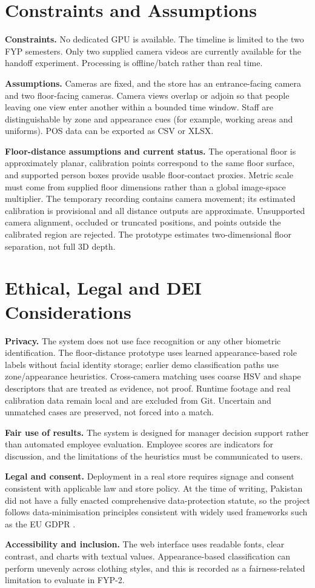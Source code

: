 \section{Constraints and Assumptions}
\textbf{Constraints.} No dedicated GPU is available. The timeline is limited to the two FYP semesters. Only two supplied camera videos are currently available for the handoff experiment. Processing is offline/batch rather than real time.

\textbf{Assumptions.} Cameras are fixed, and the store has an entrance-facing camera and two floor-facing cameras. Camera views overlap or adjoin so that people leaving one view enter another within a bounded time window. Staff are distinguishable by zone and appearance cues (for example, working areas and uniforms). POS data can be exported as CSV or XLSX.

\textbf{Floor-distance assumptions and current status.} The operational floor is approximately planar, calibration points correspond to the same floor surface, and supported person boxes provide usable floor-contact proxies. Metric scale must come from supplied floor dimensions rather than a global image-space multiplier. The temporary  recording contains camera movement; its estimated calibration is provisional and all distance outputs are approximate. Unsupported camera alignment, occluded or truncated positions, and points outside the calibrated region are rejected. The prototype estimates two-dimensional floor separation, not full 3D depth.

\section{Ethical, Legal and DEI Considerations}
\textbf{Privacy.} The system does not use face recognition or any other biometric identification. The floor-distance prototype uses learned appearance-based role labels without facial identity storage; earlier demo classification paths use zone/appearance heuristics. Cross-camera matching uses coarse HSV and shape descriptors that are treated as evidence, not proof. Runtime footage and real calibration data remain local and are excluded from Git. Uncertain and unmatched cases are preserved, not forced into a match.

\textbf{Fair use of results.} The system is designed for manager decision support rather than automated employee evaluation. Employee scores are indicators for discussion, and the limitations of the heuristics must be communicated to users.

\textbf{Legal and consent.} Deployment in a real store requires signage and consent consistent with applicable law and store policy. At the time of writing, Pakistan did not have a fully enacted comprehensive data-protection statute, so the project follows data-minimisation principles consistent with widely used frameworks such as the EU GDPR \cite{gdpr2016}. 

\textbf{Accessibility and inclusion.} The web interface uses readable fonts, clear contrast, and charts with textual values. Appearance-based classification can perform unevenly across clothing styles, and this is recorded as a fairness-related limitation to evaluate in FYP-2.
